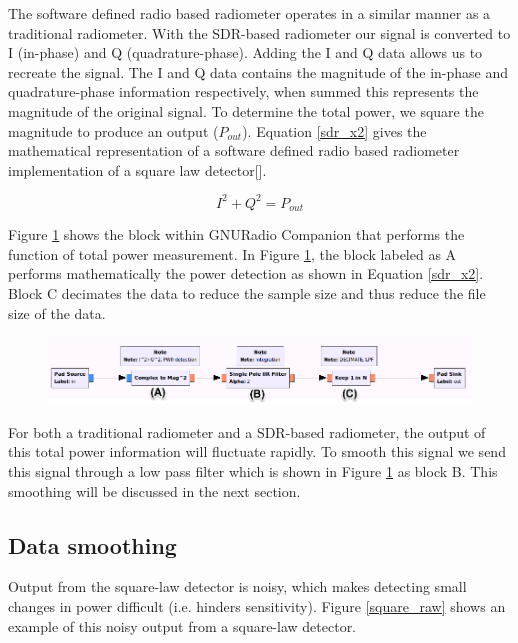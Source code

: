 The software defined radio based radiometer operates in a similar manner as a traditional radiometer.  With the SDR-based radiometer our signal is converted to I (in-phase) and Q (quadrature-phase).  Adding the I and Q data allows us to recreate the signal.  The I and Q data contains the magnitude of the in-phase and quadrature-phase information respectively, when summed this represents the magnitude of the original signal.  To determine the total power, we square the magnitude to produce an output ($P_{out}$).  Equation \ref{sdr_x2} gives the mathematical representation of a software defined radio based radiometer implementation of a square law detector[\cite{Rashid}]. 

\begin{equation}\label{sdr_x2}
I^2+Q^2 = P_{out}
\end{equation}

Figure \ref{square_block} shows the block within GNURadio Companion that performs the function of total power measurement.  In Figure \ref{square_block}, the block labeled as A performs mathematically the power detection as shown in Equation \ref{sdr_x2}.  Block C decimates the data to reduce the sample size and thus reduce the file size of the data.  

{\begin{figure}[h!tb] 
\centering
\includegraphics[width=17cm]{Images/TPR_grc.png}
\label{square_block}
\end{figure}
}

For both a traditional radiometer and a SDR-based radiometer, the output of this total power information will fluctuate rapidly.  To smooth this signal we send this signal through a low pass filter which is shown in Figure \ref{square_block} as block B.  This smoothing will be discussed in the next section.

\subsection{Data smoothing}\label{smoothing}

Output from the square-law detector is noisy, which makes detecting small changes in power difficult (i.e. hinders sensitivity).  Figure \ref{square_raw} shows an example of this noisy output from a square-law detector.

